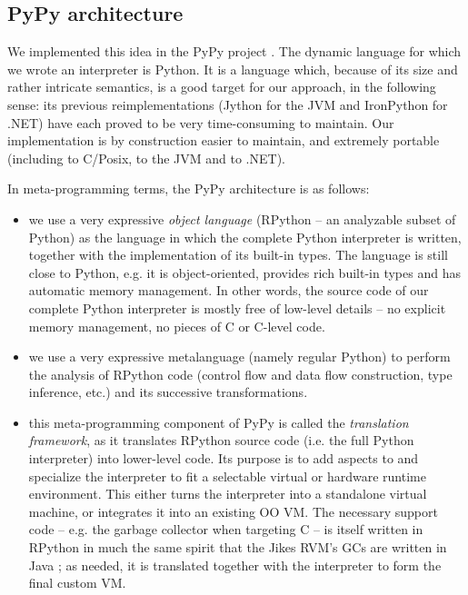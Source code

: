 \documentclass[utf8x]{llncs}
\begin{document}
\subsection{PyPy architecture}

We implemented this idea in the PyPy project \cite{pypy}.  The dynamic language
for which we wrote an interpreter is Python.  It is a language which,
because of its size and rather intricate semantics, is a good target for
our approach, in the following sense: its previous reimplementations
(Jython for the JVM and IronPython for .NET) have each proved to be very
time-consuming to maintain.  Our implementation is by construction
easier to maintain, and extremely portable (including to C/Posix, to the
JVM and to .NET).

In meta-programming terms, the PyPy architecture is as follows:

\begin{itemize}

\item
we use a very expressive \emph{object language} (RPython -- an analyzable
subset of Python) as the language in which the complete Python
interpreter is written, together with the implementation of its
built-in types.  The language is still close to Python, e.g.  it is
object-oriented, provides rich built-in types and has automatic memory
management.  In other words, the source code of our complete Python
interpreter is mostly free of low-level details -- no explicit memory
management, no pieces of C or C-level code.

\item
we use a very expressive metalanguage (namely regular Python) to
perform the analysis of RPython code (control flow and data flow
construction, type inference, etc.) and its successive
transformations.

\item
this meta-programming component of PyPy is called the \emph{translation
framework}, as it translates RPython source code (i.e. the full Python
interpreter) into lower-level code.  Its purpose is to add aspects to
and specialize the interpreter to fit a selectable virtual or hardware
runtime environment.  This either turns the interpreter into a
standalone virtual machine, or integrates it into an existing OO VM.
The necessary support code -- e.g. the garbage collector when
targeting C -- is itself written in RPython in much the same spirit
that the Jikes RVM's GCs are written in Java \cite{JikesGC}; as needed, it is
translated together with the interpreter to form the final custom VM.
\end{itemize}
\end{document}
